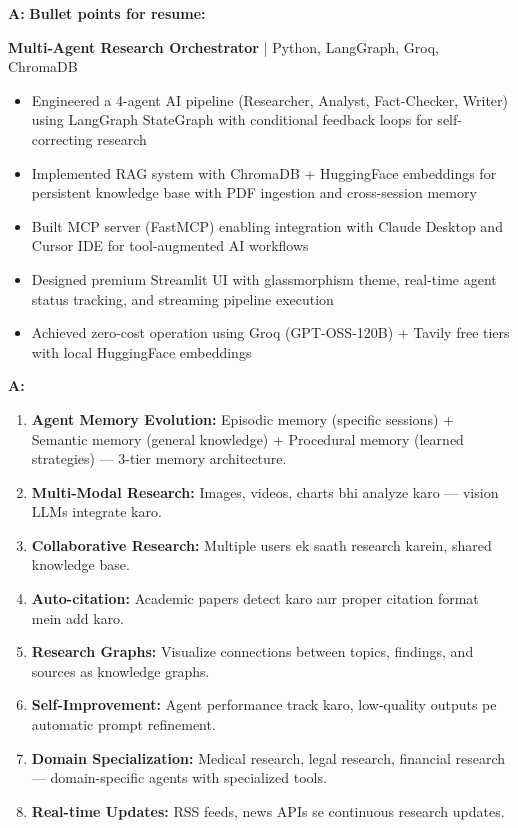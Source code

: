 \documentclass[12pt, a4paper]{article}
\begin{document}
\begin{interviewbox}[title={\faIcon{user-tie} ~Q49: Agar ye project resume pe daal rahe ho toh kaise describe karoge?}]
\textbf{A:} \textbf{Bullet points for resume:}

\textbf{Multi-Agent Research Orchestrator} | Python, LangGraph, Groq, ChromaDB
\begin{itemize}
\item Engineered a 4-agent AI pipeline (Researcher, Analyst, Fact-Checker, Writer) using LangGraph StateGraph with conditional feedback loops for self-correcting research
\item Implemented RAG system with ChromaDB + HuggingFace embeddings for persistent knowledge base with PDF ingestion and cross-session memory
\item Built MCP server (FastMCP) enabling integration with Claude Desktop and Cursor IDE for tool-augmented AI workflows
\item Designed premium Streamlit UI with glassmorphism theme, real-time agent status tracking, and streaming pipeline execution
\item Achieved zero-cost operation using Groq (GPT-OSS-120B) + Tavily free tiers with local HuggingFace embeddings
\end{itemize}
\end{interviewbox}

\begin{interviewbox}[title={\faIcon{user-tie} ~Q50: Is project ka future scope kya hai?}]
\textbf{A:}
\begin{enumerate}
\item \textbf{Agent Memory Evolution:} Episodic memory (specific sessions) + Semantic memory (general knowledge) + Procedural memory (learned strategies) --- 3-tier memory architecture.

\item \textbf{Multi-Modal Research:} Images, videos, charts bhi analyze karo --- vision LLMs integrate karo.

\item \textbf{Collaborative Research:} Multiple users ek saath research karein, shared knowledge base.

\item \textbf{Auto-citation:} Academic papers detect karo aur proper citation format mein add karo.

\item \textbf{Research Graphs:} Visualize connections between topics, findings, and sources as knowledge graphs.

\item \textbf{Self-Improvement:} Agent performance track karo, low-quality outputs pe automatic prompt refinement.

\item \textbf{Domain Specialization:} Medical research, legal research, financial research --- domain-specific agents with specialized tools.

\item \textbf{Real-time Updates:} RSS feeds, news APIs se continuous research updates.
\end{enumerate}
\end{interviewbox}
\end{document}

